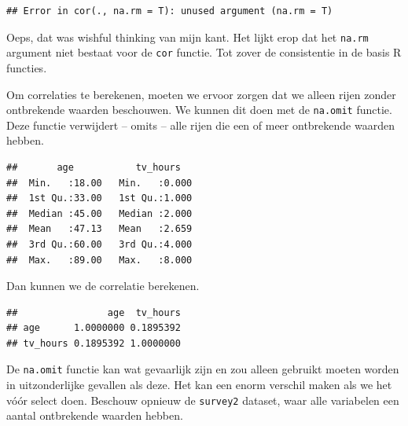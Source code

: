 \documentclass[]{tufte-book}
\newenvironment{Shaded}{}{}
\newcommand{\KeywordTok}[1]{\textcolor[rgb]{0.00,0.44,0.13}{\textbf{#1}}}
\newcommand{\NormalTok}[1]{#1}
\newcommand{\OperatorTok}[1]{\textcolor[rgb]{0.40,0.40,0.40}{#1}}
\newcommand{\StringTok}[1]{\textcolor[rgb]{0.25,0.44,0.63}{#1}}
\begin{document}
\begin{verbatim}
## Error in cor(., na.rm = T): unused argument (na.rm = T)
\end{verbatim}

Oeps, dat was wishful thinking van mijn kant. Het lijkt erop dat het \texttt{na.rm} argument niet bestaat voor de \texttt{cor} functie. Tot zover de consistentie in de basis R functies.

Om correlaties te berekenen, moeten we ervoor zorgen dat we alleen rijen zonder ontbrekende waarden beschouwen. We kunnen dit doen met de \texttt{na.omit} functie. Deze functie verwijdert -- omits -- alle rijen die een of meer ontbrekende waarden hebben.

\begin{Shaded}
\end{Shaded}

\begin{verbatim}
##       age           tv_hours    
##  Min.   :18.00   Min.   :0.000  
##  1st Qu.:33.00   1st Qu.:1.000  
##  Median :45.00   Median :2.000  
##  Mean   :47.13   Mean   :2.659  
##  3rd Qu.:60.00   3rd Qu.:4.000  
##  Max.   :89.00   Max.   :8.000
\end{verbatim}

Dan kunnen we de correlatie berekenen.

\begin{Shaded}
\end{Shaded}

\begin{verbatim}
##                age  tv_hours
## age      1.0000000 0.1895392
## tv_hours 0.1895392 1.0000000
\end{verbatim}

De \texttt{na.omit} functie kan wat gevaarlijk zijn en zou alleen gebruikt moeten worden in uitzonderlijke gevallen als deze. Het kan een enorm verschil maken als we het vóór select doen. Beschouw opnieuw de \texttt{survey2} dataset, waar alle variabelen een aantal ontbrekende waarden hebben.
\end{document}
